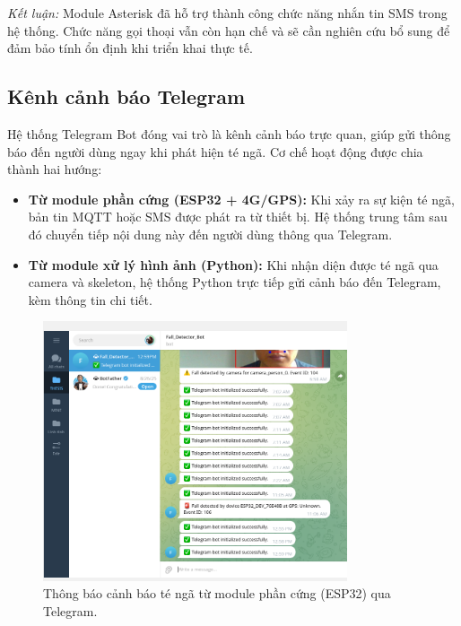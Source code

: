\textit{Kết luận:} Module Asterisk đã hỗ trợ thành công chức năng nhắn tin SMS trong hệ thống. Chức năng gọi thoại vẫn còn hạn chế và sẽ cần nghiên cứu bổ sung để đảm bảo tính ổn định khi triển khai thực tế.

\subsection{Kênh cảnh báo Telegram}
\label{sec:telegram_alert}

Hệ thống Telegram Bot đóng vai trò là kênh cảnh báo trực quan, giúp gửi thông báo đến người dùng ngay khi phát hiện té ngã.  
Cơ chế hoạt động được chia thành hai hướng:
\begin{itemize}
    \item \textbf{Từ module phần cứng (ESP32 + 4G/GPS):} Khi xảy ra sự kiện té ngã, bản tin MQTT hoặc SMS được phát ra từ thiết bị. Hệ thống trung tâm sau đó chuyển tiếp nội dung này đến người dùng thông qua Telegram.
    \item \textbf{Từ module xử lý hình ảnh (Python):} Khi nhận diện được té ngã qua camera và skeleton, hệ thống Python trực tiếp gửi cảnh báo đến Telegram, kèm thông tin chi tiết.
\end{itemize}

\begin{figure}[H]
    \centering
    \includegraphics[width=0.8\textwidth]{figures/telegram_fall_module1_send.png}
    \caption{Thông báo cảnh báo té ngã từ module phần cứng (ESP32) qua Telegram.}
    \label{fig:telegram_hw}
\end{figure}

